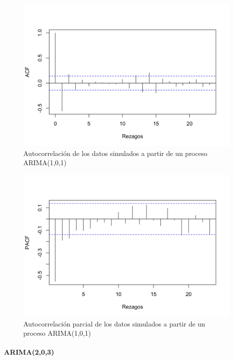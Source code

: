 \documentclass[
]{article}
\begin{document}
\begin{figure}[H]
\includegraphics[width=1\linewidth,height=1\textheight]{Tesis_files/figure-latex/arima101_acf-1} \caption{Autocorrelación de los datos simulados a partir de un proceso ARIMA(1,0,1)}\label{fig:arima101_acf}
\end{figure}

\begin{figure}[H]
\includegraphics[width=1\linewidth,height=1\textheight]{Tesis_files/figure-latex/arima101_pacf-1} \caption{Autocorrelación parcial de los datos simulados a partir de un proceso ARIMA(1,0,1)}\label{fig:arima101_pacf}
\end{figure}

\paragraph{ARIMA(2,0,3)}
\end{document}
